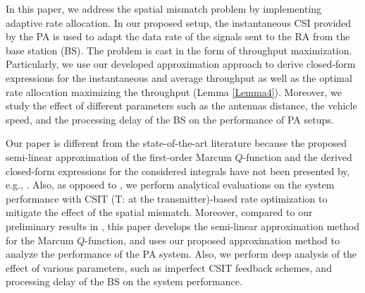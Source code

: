 In this paper, we address the spatial  mismatch problem by implementing adaptive rate allocation. In our proposed setup, the instantaneous CSI provided by the PA is used to adapt the data rate of the signals sent to the RA from the base station (BS). The problem is cast in the form of throughput maximization. Particularly, we use our developed approximation approach to derive closed-form expressions for the instantaneous and average throughput as well as the optimal rate allocation maximizing the throughput (Lemma \ref{Lemma4}). Moreover, we study the effect of different parameters such as the antennas distance, the vehicle speed, and the processing delay of the BS on the performance of PA setups. 


Our paper is different from the state-of-the-art literature because the proposed semi-linear approximation of the first-order Marcum $Q$-function and the derived closed-form expressions for the considered integrals have not been presented by, e.g., \cite{Bocus2013CLapproximation,helstrom1994elements,Fu2011GLOBECOMexponential,Makki2013TCfeedback,Makki2011Eurasipcapacity,Makki2018WCLwireless,Makki2016TVTperformance,Simon2003TWCsome,Suraweera2010TVTcapacity,Kang2003JSAClargest,Chen2004TCdistribution,Ma2000JSACunified,Zhang2002TCgeneral,Ghasemi2008ICMspectrum,Digham2007TCenergy, simon2002bookdigital,Cao2016CLsolutions,sofotasios2015solutions,Cui2012ELtwo,Azari2018TCultra,Alam2014INFOCOMWrobust,Gao2018IAadmm,Shen2018TVToutage,Song2017JLTimpact,Tang2019IAan,ermolova2014laplace,peppas2013performance,zhao2008ELtight,Simon2000TCexponential,annamalai2001WCMCcauchy,Sofotasios2010ISWCSnovel,Li2010TCnew,andras2011Mathematicageneralized,Gaur2003TVTsome,Kam2008TCcomputing,Corazza2002TITnew,Baricz2009TITnew,chiani1999ELintegral,jimenez2014connection,Sternad2012WCNCWusing,DT2015ITSMmaking,BJ2017PIMRCpredictor,phan2018WSAadaptive,Jamaly2014EuCAPanalysis, BJ2017ICCWusing,Apelfrojd2018PIMRCkalman,Jamaly2019IETeffects,Guo2019WCLrate}. Also, as opposed to \cite{Sternad2012WCNCWusing,DT2015ITSMmaking,BJ2017PIMRCpredictor,phan2018WSAadaptive,Jamaly2014EuCAPanalysis, BJ2017ICCWusing,Apelfrojd2018PIMRCkalman,Jamaly2019IETeffects}, we perform analytical evaluations on the system performance with CSIT (T: at the transmitter)-based rate optimization to mitigate the effect of the spatial mismatch. Moreover, compared to our preliminary results in \cite{Guo2019WCLrate}, this paper develops the semi-linear approximation method for the Marcum $Q$-function, and uses our proposed approximation method to analyze the performance of the PA system. Also, we perform deep analysis of the effect of various parameters, such as imperfect CSIT feedback schemes, and processing delay of the BS on the system performance. 



